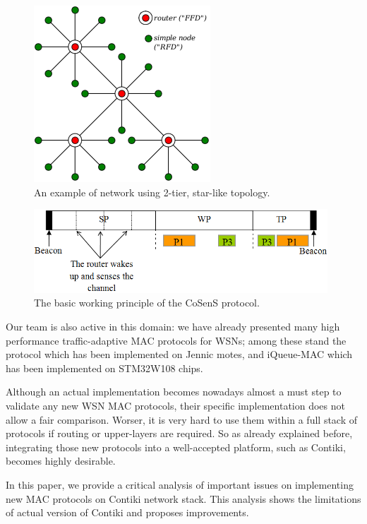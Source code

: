 \documentclass[12pt,twoside,a4paper]{article}
\begin{document}
\begin{figure}[!t]
\centering
\includegraphics{star-topo-net.png}
\caption{An example of network using 2-tier, star-like topology.}
\label{star-topo-net}
\end{figure}
\hfil
\begin{figure}[!t]
\centering
\includegraphics[width=11cm]{superframe.png}
\caption{The basic working principle of the CoSenS protocol.}
\label{cosens-principle}
\end{figure}

Our team is also active in this domain: we have already presented many
high performance traffic-adaptive MAC protocols for WSNs; among these stand
the  \cite{cosens} protocol which has been implemented on
Jennic motes, and iQueue-MAC \cite{iqueue-mac} which has been implemented
on STM32W108 chips.

Although an actual implementation becomes nowadays almost a must step
to validate any new WSN MAC protocols, their specific implementation
does not allow a fair comparison. Worser, it is very hard to use them
within a full stack of protocols if routing or upper-layers are required.
So as already explained before, integrating those new protocols into
a well-accepted platform, such as Contiki, becomes highly desirable.

In this paper, we provide a critical analysis of important issues on
implementing new MAC protocols on Contiki network stack. This analysis
shows the limitations of actual version of Contiki and proposes improvements.
\end{document}

